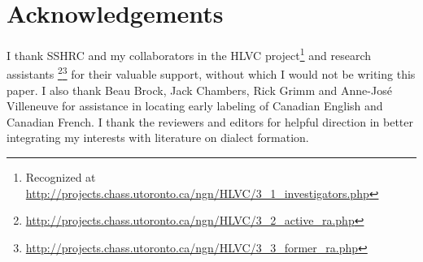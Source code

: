 \documentclass[output=paper]{LSP/langsci}
\begin{document}
\section*{Acknowledgements}
I thank SSHRC and my collaborators in the HLVC project\footnote{Recognized at \url{http://projects.chass.utoronto.ca/ngn/HLVC/3\_1\_investigators.php}} and research assistants \footnote{\url{http://projects.chass.utoronto.ca/ngn/HLVC/3\_2\_active\_ra.php}}\footnote{  \url{http://projects.chass.utoronto.ca/ngn/HLVC/3\_3\_former\_ra.php}} for their valuable support, without which I would not be writing this paper. I also thank Beau Brock, Jack Chambers, Rick Grimm and Anne-José Villeneuve for assistance in locating early labeling of Canadian English and Canadian French. I thank the reviewers and editors for helpful direction in better integrating my interests with literature on dialect formation.

\printbibliography[heading=subbibliography,notkeyword=this]
\end{document}
